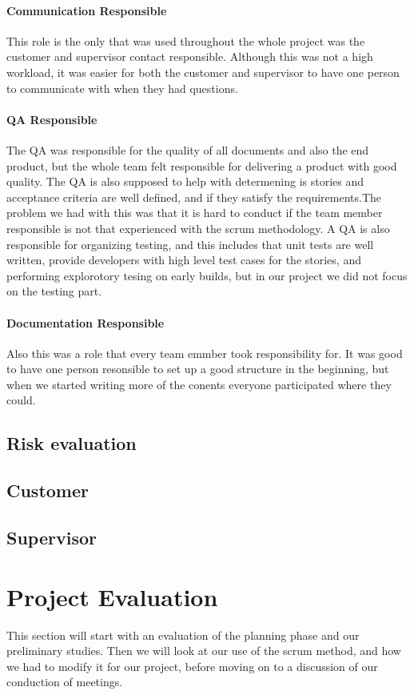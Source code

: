 \paragraph{Communication Responsible}
This role is the only that was used throughout the whole project was the customer and supervisor contact responsible. Although this was not a high workload, it was easier for both the customer and supervisor to have one person to communicate with when they had questions.  

\paragraph{QA Responsible}
The QA was responsible for the quality of all documents and also the end product, but the whole team felt responsible for delivering a product with good quality. The QA is also supposed to help with determening is stories and acceptance criteria are well defined, and if they satisfy the requirements.The problem we had with this was that it is hard to conduct if the team member responsible is not that experienced with the scrum methodology. A QA is also responsible for organizing testing, and this includes that unit tests are well written, provide developers with high level test cases for the stories, and performing explorotory tesing on early builds, but in our project we did not focus on the testing part. 

\paragraph{Documentation Responsible}
Also this was a role that every team emmber took responsibility for. It was good to have one person resonsible to set up a good structure in the beginning, but when we started writing more of the conents everyone participated where they could. 

\subsection{Risk evaluation}
\subsection{Customer} 
\subsection{Supervisor}
\section{Project Evaluation}
This section will start with an evaluation of the planning phase and our preliminary studies.  
Then we will look at our use of the scrum method, and how we had to modify it for our project, before moving on to a discussion of our conduction of meetings. 
